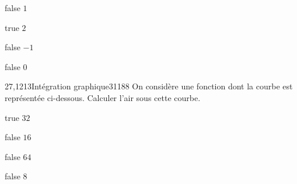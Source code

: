         \begin{reponses}
             \item[false] $1$
		    \item[true] $2$
		    \item[false] $-1$
		    \item[false]  $0$
		    \end{reponses}
        \begin{question}{27,1213}{Intégration graphique}{3}{1188}
             On considère une fonction dont la courbe est représentée ci-dessous. Calculer l'air sous cette courbe. 
            \begin{figure}
             \end{figure}
        \end{question}
        \begin{reponses}
             \item[true] $32$
		    \item[false] $16$
		    \item[false] $64$
		    \item[false] $8$
		    \end{reponses}
